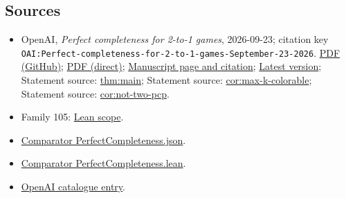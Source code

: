 \documentclass[11pt]{article}
\begin{document}
\subsection{Sources}
\begin{itemize}
\item OpenAI, \emph{Perfect completeness for 2-to-1 games}, 2026-09-23; citation key \texttt{OAI:Perfect-completeness-for-2-to-1-games-September-23-2026}. \href{https://github.com/openai/math/blob/adc7f1241b42e322a6451854ab7e4b4c146bf78a/preprints/Perfect-completeness-for-2-to-1-games-September-23-2026/paper.pdf}{PDF (GitHub)}; \href{https://github.com/openai/math/raw/adc7f1241b42e322a6451854ab7e4b4c146bf78a/preprints/Perfect-completeness-for-2-to-1-games-September-23-2026/paper.pdf}{PDF (direct)}; \href{https://github.com/openai/math/blob/adc7f1241b42e322a6451854ab7e4b4c146bf78a/preprints/Perfect-completeness-for-2-to-1-games-September-23-2026/README.md}{Manuscript page and citation}; \href{https://github.com/openai/math/blob/main/preprints/Perfect-completeness-for-2-to-1-games-September-23-2026/paper.pdf}{Latest version}; Statement source: \href{https://github.com/openai/math/blob/adc7f1241b42e322a6451854ab7e4b4c146bf78a/preprints/Perfect-completeness-for-2-to-1-games-September-23-2026/build/00-introduction.tex\#L32}{thm:main}; Statement source: \href{https://github.com/openai/math/blob/adc7f1241b42e322a6451854ab7e4b4c146bf78a/preprints/Perfect-completeness-for-2-to-1-games-September-23-2026/build/00-introduction.tex\#L189}{cor:max-k-colorable}; Statement source: \href{https://github.com/openai/math/blob/adc7f1241b42e322a6451854ab7e4b4c146bf78a/preprints/Perfect-completeness-for-2-to-1-games-September-23-2026/build/00-introduction.tex\#L222}{cor:not-two-pcp}.
\item Family 105: \href{https://github.com/openai/math/blob/adc7f1241b42e322a6451854ab7e4b4c146bf78a/lean/docs/105.md}{Lean scope}.
\item \href{https://github.com/openai/math/blob/adc7f1241b42e322a6451854ab7e4b4c146bf78a/lean/ComparatorChallenges/PerfectCompleteness.json}{Comparator PerfectCompleteness.json}.
\item \href{https://github.com/openai/math/blob/adc7f1241b42e322a6451854ab7e4b4c146bf78a/lean/ComparatorChallenges/PerfectCompleteness.lean}{Comparator PerfectCompleteness.lean}.
\item \href{https://github.com/openai/math/blob/adc7f1241b42e322a6451854ab7e4b4c146bf78a/CONTENTS.md}{OpenAI catalogue entry}.
\end{itemize}
\end{document}
